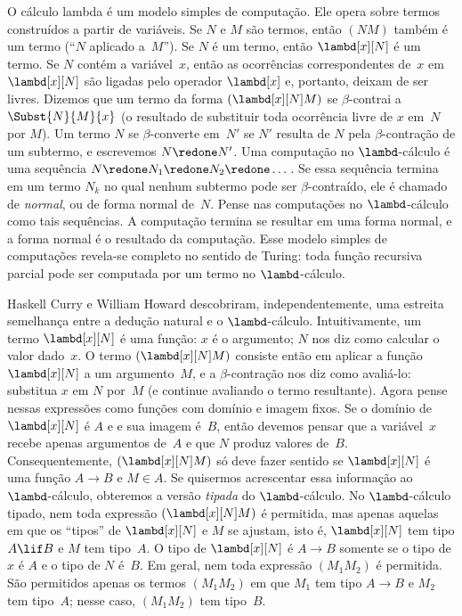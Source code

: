 \documentclass[../../../include/open-logic-section]{subfiles}
\begin{document}


O cálculo lambda é um modelo simples de computação. Ele opera sobre
termos construídos a partir de variáveis. Se $N$ e $M$ são termos,
então $(NM)$ também é um termo (``$N$ aplicado a~$M$''). Se $N$ é um
termo, então $\lambd[x][N]$ é um termo. Se $N$ contém a variável~$x$,
então as ocorrências correspondentes de~$x$ em $\lambd[x][N]$ são
ligadas pelo operador $\lambd[x]$ e, portanto, deixam de ser livres.
Dizemos que um termo da forma $(\lambd[x][N]M)$ se $\beta$-contrai a
$\Subst{N}{M}{x}$ (o resultado de substituir toda ocorrência livre de
$x$ em~$N$ por $M$). Um termo $N$ se $\beta$-converte em~$N'$ se $N'$
resulta de $N$ pela $\beta$-contração de um subtermo, e escrevemos $N
\redone N'$. Uma computação no $\lambd$-cálculo é uma sequência $N
\redone N_1 \redone N_2 \redone \dots$. Se essa sequência termina em
um termo $N_k$ no qual nenhum subtermo pode ser $\beta$-contraído, ele
é chamado de \emph{normal}, ou de forma normal de~$N$. Pense nas
computações no $\lambd$-cálculo como tais sequências. A computação
termina se resultar em uma forma normal, e a forma normal é o resultado da
computação. Esse modelo simples de computações revela-se completo no
sentido de Turing: toda função recursiva parcial pode ser computada
por um termo no $\lambd$-cálculo.

Haskell Curry e William Howard descobriram, independentemente, uma
estreita semelhança entre a dedução natural e o $\lambd$-cálculo.
Intuitivamente, um termo $\lambd[x][N]$ é uma função: $x$ é o argumento;
$N$ nos diz como calcular o valor dado~$x$. O termo
$(\lambd[x][N]M)$ consiste então em aplicar a função $\lambd[x][N]$ a
um argumento~$M$, e a $\beta$-contração nos diz como avaliá-lo:
substitua $x$ em $N$ por~$M$ (e continue avaliando o termo resultante).
Agora pense nessas expressões como funções com domínio e imagem fixos.
Se o domínio de $\lambd[x][N]$ é $A$ e e sua imagem é~$B$, então
devemos pensar que a variável~$x$ recebe apenas argumentos de~$A$ e
que $N$ produz valores de~$B$. Consequentemente, $(\lambd[x][N]M)$ só
deve fazer sentido se $\lambd[x][N]$ é uma função $A \to B$ e $M \in
A$. Se quisermos acrescentar essa informação ao $\lambd$-cálculo,
obteremos a versão \emph{tipada} do $\lambd$-cálculo. No
$\lambd$-cálculo tipado,
nem toda expressão $(\lambd[x][N]M)$ é permitida, mas apenas aquelas
em que os ``tipos'' de $\lambd[x][N]$ e $M$ se ajustam, isto é,
$\lambd[x][N]$ tem tipo $A \lif B$ e $M$ tem tipo~$A$. O tipo de
$\lambd[x][N]$ é $A \to B$ somente se o tipo de $x$ é $A$ e o tipo de
$N$ é~$B$. Em geral, nem toda expressão $(M_1M_2)$ é permitida. São
permitidos apenas os termos $(M_1M_2)$ em que $M_1$ tem tipo $A \to B$
e $M_2$ tem tipo~$A$; nesse caso, $(M_1M_2)$ tem tipo~$B$.
\end{document}
